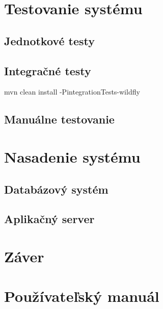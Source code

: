 \documentclass[12pt,oneside]{fithesis2}
\begin{document}
    \chapter{Testovanie systému}
      \section{Jednotkové testy}
      \section{Integračné testy}
      \par mvn clean install -PintegrationTests-wildfly
      \section{Manuálne testovanie}
    \chapter{Nasadenie systému} \label{nasadenie}
      \section{Databázový systém}
      \section{Aplikačný server}
    \chapter{Záver}   
        
    \appendix
    \chapter{Používateľský manuál} 	  %
\end{document}
